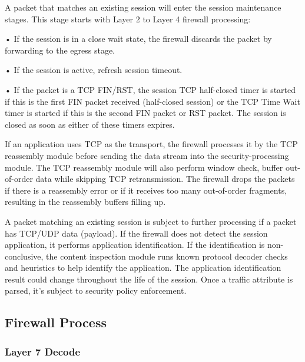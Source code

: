 A packet that matches an existing session will enter the session maintenance stages. This stage starts with Layer 2 to Layer 4 firewall processing:


• If the session is in a close wait state, the firewall discards the packet by forwarding to the egress stage.


• If the session is active, refresh session timeout.


• If the packet is a TCP FIN/RST, the session TCP half-closed timer is started if this is the first FIN packet received (half-closed session) 
or the TCP Time Wait timer is started if this is the second FIN packet or RST packet. The session is closed as soon as either of these timers expires. 


If an application uses TCP as the transport, the firewall processes it by the TCP reassembly module before sending the data stream into the security-processing module. 
The TCP reassembly module will also perform window check, buffer out-of-order data while skipping TCP retransmission. 
The firewall drops the packets if there is a reassembly error or if it receives too many out-of-order fragments, resulting in the reassembly buffers filling up.


A packet matching an existing session is subject to further processing if a packet has TCP/UDP data (payload). 
If the firewall does not detect the session application, it performs application identification. 
If the identification is non-conclusive, the content inspection module runs known protocol decoder checks and heuristics to help identify the application. 
The application identification result could change throughout the life of the session. Once a traffic attribute is parsed, it’s subject to security policy enforcement.

\subsection*{\hypertarget{link:Firewall Process}{Firewall Process}}
\label{sec:appendix_e:sequence:firewall}

\subsubsection*{\hypertarget{link:Layer 7 Decode}{Layer 7 Decode}}
\label{sec:appendix_e:sequence:firewall:decode}

